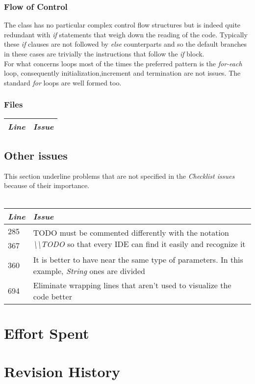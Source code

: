 \documentclass[11pt,a4paper]{report}
\begin{document}
\subsection{Flow of Control}
The class has no particular complex control flow structures but is indeed quite redundant with \textit{if} statements that weigh down the reading of the code. Typically these \textit{if} clauses are not followed by \textit{else} counterparts and so the default branches in these cases are trivially the instructions that follow the \textit{if} block.\\For what concerns loops most of the times the preferred pattern is the \textit{for-each} loop, consequently initialization,increment and termination are not issues. The standard \textit{for} loops are well formed too.
\subsection{Files}
\begin{tabularx}{\textwidth}{|l|X|}
	\hline
	\textit{Line} & \textit{Issue}\\
	\hline
\end{tabularx}
\section{Other issues}
This section underline problems that are not specified in the \textit{Checklist issues} because of their importance.\\\\
\begin{tabularx}{\textwidth}{|l|X|}
	\hline
	\textit{Line} & \textit{Issue}\\
	\hline
	285 & \multirow{2}{\linewidth}{TODO must be commented differently with the notation \textit{\textbackslash\textbackslash TODO} so that every IDE can find it easily and recognize it}\\
	367 & \\
	\hline
	360 & It is better to have near the same type of parameters. In this example, \textit{String} ones are divided\\
	\hline
	694 & Eliminate wrapping lines that aren't used to visualize the code better\\
	\hline
\end{tabularx}
\chapter{Effort Spent}
\chapter{Revision History}
\end{document}
